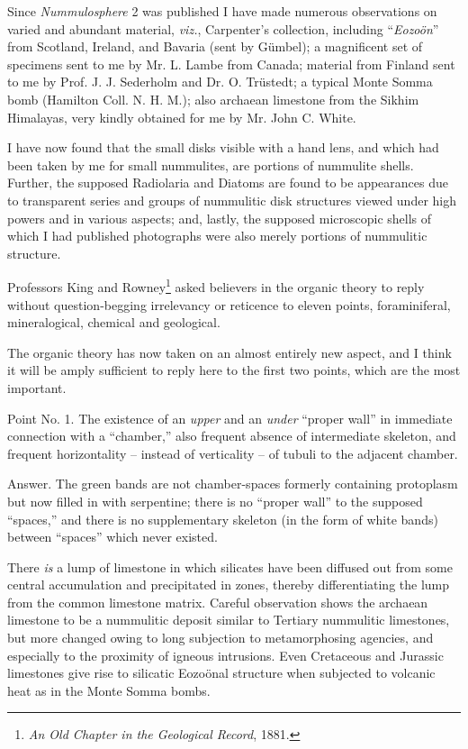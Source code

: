 \documentclass[a4paper, 12pt, oneside]{article}
\begin{document}
Since \emph{Nummulosphere} 2 was published I have made numerous observations on varied and abundant material, \emph{viz.}, Carpenter's collection, including ``\emph{Eozoön}'' from Scotland, Ireland, and Bavaria (sent by Gümbel); a magnificent set of specimens sent to me by Mr. L. Lambe from Canada; material from Finland sent to me by Prof. J. J. Sederholm and Dr. O. Trüstedt; a typical Monte Somma bomb (Hamilton Coll. N. H. M.); also archaean limestone from the Sikhim Himalayas, very kindly obtained for me by Mr. John C. White.

I have now found that the small disks visible with a hand lens, and which had been taken by me for small nummulites, are portions of nummulite shells. Further, the supposed Radiolaria and Diatoms are found to be appearances due to transparent series and groups of nummulitic disk structures viewed under high powers and in various aspects; and, lastly, the supposed microscopic shells of which I had published photographs were also merely portions of nummulitic structure.

Professors King and Rowney\footnote{\emph{An Old Chapter in the Geological Record}, 1881.} asked believers in the organic theory to reply without question-begging irrelevancy or reticence to eleven points, foraminiferal, mineralogical, chemical and geological.

The organic theory has now taken on an almost entirely new aspect, and I think it will be amply sufficient to reply here to the first two points, which are the most important.

Point No. 1. The existence of an \emph{upper} and an \emph{under} ``proper wall'' in immediate connection with a ``chamber,'' also frequent absence of intermediate skeleton, and frequent horizontality -- instead of verticality -- of tubuli to the adjacent chamber.

Answer. The green bands are not chamber-spaces formerly containing protoplasm but now filled in with serpentine; there is no ``proper wall'' to the supposed ``spaces,'' and there is no supplementary skeleton (in the form of white bands) between ``spaces'' which never existed.

There \emph{is} a lump of limestone in which silicates have been diffused out from some central accumulation and precipitated in zones, thereby differentiating the lump from the common limestone matrix. Careful observation shows the archaean limestone to be a nummulitic deposit similar to Tertiary nummulitic limestones, but more changed owing to long subjection to metamorphosing agencies, and especially to the proximity of igneous intrusions. Even Cretaceous and Jurassic limestones give rise to silicatic Eozoönal structure when subjected to volcanic heat as in the Monte Somma bombs.
\end{document}
